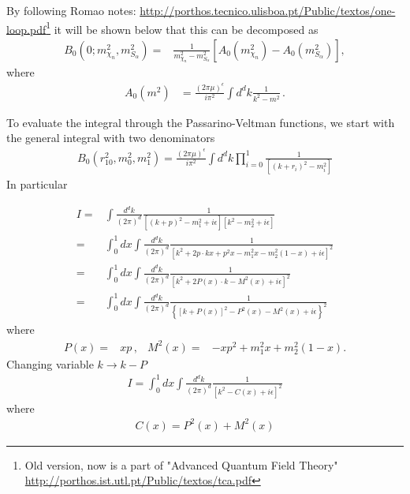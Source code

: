 By following Romao notes: \url{http://porthos.tecnico.ulisboa.pt/Public/textos/one-loop.pdf}\footnote{Old version, now is a part of "Advanced Quantum Field Theory" \url{http://porthos.ist.utl.pt/Public/textos/tca.pdf}} 
it will be shown below that this can be decomposed as
\begin{align}
  \label{eq:mnueig}
  B_0 \left(0;m_{\chi_n}^2,m^2_{S_{\alpha}} \right)
            =&\frac{1}{m_{\chi_n}^2-m_{S_\alpha}^2}\left[ A_0\left(m_{\chi_n}^2\right)-A_0\left(m_{S_\alpha}^2\right)  \right],
\end{align}
where
\begin{align}
   A_{0}\left(m^{2}\right) &=\frac{(2 \pi \mu)^{\epsilon}}{i \pi^{2}} \int d^{d} k \frac{1}{k^{2}-m^{2}}\,.
\end{align}


To evaluate the integral through the Passarino-Veltman functions, we start with the general integral with two denominators
\begin{align}
  \label{eq:pvbo}
  B_{0}\left(r_{10}^{2}, m_{0}^{2}, m_{1}^{2}\right)=\frac{(2 \pi \mu)^{\epsilon}}{i \pi^{2}} \int d^{d} k \prod_{i=0}^{1} \frac{1}{\left[\left(k+r_{i}\right)^{2}-m_{i}^{2}\right]}
\end{align}
In particular

\begin{align}
  I =&\int \frac{d^{d} k}{(2 \pi)^{d}} \frac{1}{\left[(k+p)^{2}-m_{1}^{2}+i \epsilon\right]\left[k^{2}-m_{2}^{2}+i \epsilon\right]} \nonumber\\
    =&\int_{0}^{1} d x \int \frac{d^{d} k}{(2 \pi)^{d}} \frac{1}{\left[k^{2}+2 p \cdot k x+p^{2} x-m_{1}^{2} x-m_{2}^{2}(1-x)+i \epsilon\right]^{2}} \nonumber\\
  =&\int_{0}^{1} d x \int \frac{d^{d} k}{(2 \pi)^{d}} \frac{1}{\left[k^{2}+2 P(x) \cdot k-M^{2}(x)+i \epsilon\right]^{2}} \nonumber\\
  =&\int_{0}^{1} d x \int \frac{d^{d} k}{(2 \pi)^{d}} \frac{1}{\left\{[k+P(x)]^{2}-P^{2}(x)-M^{2}(x)+i \epsilon\right\}^{2}}
\end{align}
where
\begin{align}
  P(x)=&x p\,,& M^{2}(x)=&-x p^{2}+m_{1}^{2} x+m_{2}^{2}(1-x).
\end{align}
Changing variable $k\to k-P$
\begin{align}
  I=\int_{0}^{1} d x \int \frac{d^{d} k}{(2 \pi)^{d}} \frac{1}{\left[k^{2}-C(x)+i \epsilon\right]^{2}}
\end{align}
where
\begin{align}
  \label{eq:cx}
  C(x)=P^{2}(x)+M^{2}(x)
\end{align}


